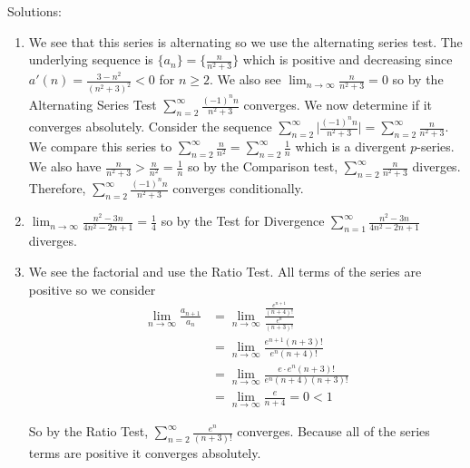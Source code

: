 \documentclass[10pt]{article}
\newcommand{\ds}{\displaystyle}
\begin{document}
Solutions:
\begin{enumerate}
\item We see that this series is alternating so we use the alternating series test. The underlying sequence is $\{a_n\}=\{\frac{n}{n^2+3}\}$ which is positive and decreasing since $a'(n)=\frac{3-n^2}{(n^2+3)^2}<0$ for $n\geq 2$. We also see $\ds \lim_{n\to \infty}\frac{n}{n^2+3}=0$ so by the Alternating Series Test $\ds \sum_{n=2}^{\infty} \frac{(-1)^nn}{n^2+3}$ converges. We now determine if it converges absolutely. Consider the sequence $\ds \sum_{n=2}^{\infty} \biggl|\frac{(-1)^nn}{n^2+3}\biggr|=\ds \sum_{n=2}^{\infty} \frac{n}{n^2+3}$. We compare this series to $\ds \sum_{n=2}^{\infty} \frac{n}{n^2}=\sum_{n=2}^{\infty} \frac{1}{n}$ which is a divergent $p$-series. We also have $\ds \frac{n}{n^2+3}>\frac{n}{n^2}=\frac{1}{n}$ so by the Comparison test, $\ds \sum_{n=2}^{\infty} \frac{n}{n^2+3}$ diverges. Therefore,  $\ds \sum_{n=2}^{\infty} \frac{(-1)^nn}{n^2+3}$ converges conditionally.

\item 
$\ds \lim_{n\to\infty} \frac{n^2-3n}{4n^2-2n+1}=\frac{1}{4}$ so by the Test for Divergence $\ds \sum_{n=1}^{\infty} \frac{n^2-3n}{4n^2-2n+1}$ diverges.

\item 
We see the factorial and use the Ratio Test. All terms of the series are positive so we consider 
\begin{align*}
\lim_{n\to\infty} \frac{a_{n+1}}{a_n}&=\lim_{n\to\infty} \frac{\frac{e^{n+1}}{(n+4)!}}{\frac{e^{n}}{(n+3)!}}\\
&=\lim_{n\to\infty}\frac{e^{n+1}(n+3)!}{e^n(n+4)!}\\
&=\lim_{n\to\infty}\frac{e\cdot e^n(n+3)!}{e^n(n+4)(n+3)!}\\
&=\lim_{n\to\infty}\frac{e}{n+4}=0<1
\end{align*}

So by the Ratio Test, $\ds \sum_{n=2}^{\infty} \frac{e^n}{(n+3)!}$ converges. Because all of the series terms are positive it converges absolutely.


\end{enumerate}
\end{document}

